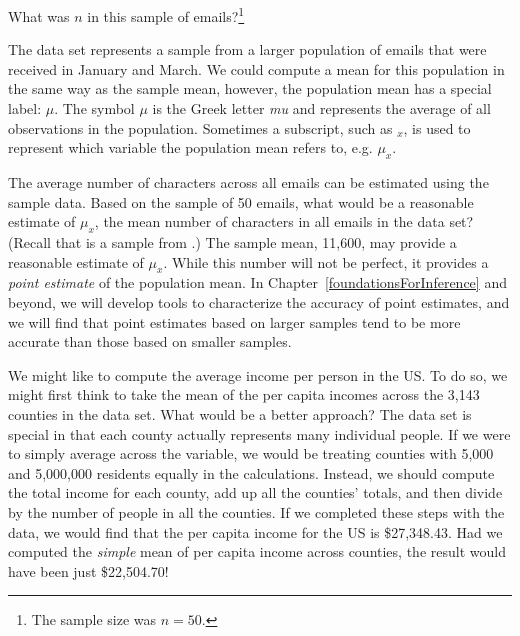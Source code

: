 \begin{exercise}
What was $n$ in this sample of emails?\footnote{The sample size was $n=50$.}
\end{exercise}

The  data set represents a sample from a larger population of emails that were received in January and March. We could compute a mean for this population in the same way as the sample mean, however, the population mean has a special label: $\mu$.  The symbol $\mu$ is the Greek letter \emph{mu} and represents the average of all observations in the population. Sometimes a subscript, such as $_x$, is used to represent which variable the population mean refers to, e.g. $\mu_x$.

\begin{example}{The average number of characters across all emails can be estimated using the sample data. Based on the sample of 50 emails, what would be a reasonable estimate of $\mu_x$, the mean number of characters in all emails in the  data set? (Recall that  is a sample from .)}
The sample mean, 11,600, may provide a reasonable estimate of $\mu_x$. While this number will not be perfect, it provides a \emph{point estimate} of the population mean. In Chapter~\ref{foundationsForInference} and beyond, we will develop tools to characterize the accuracy of point estimates, and we will find that point estimates based on larger samples tend to be more accurate than those based on smaller samples.
\end{example}

\begin{example}{We might like to compute the average income per person in the US. To do so, we might first think to take the mean of the per capita incomes across the 3,143 counties in the  data set. What would be a better approach?} \label{wtdMeanOfIncome}
The  data set is special in that each county actually represents many individual people. If we were to simply average across the  variable, we would be treating counties with 5,000 and 5,000,000 residents equally in the calculations. Instead, we should compute the total income for each county, add up all the counties' totals, and then divide by the number of people in all the counties. If we completed these steps with the  data, we would find that the per capita income for the US is \$27,348.43. Had we computed the \emph{simple} mean of per capita income across counties, the result would have been just \$22,504.70!
\end{example}

